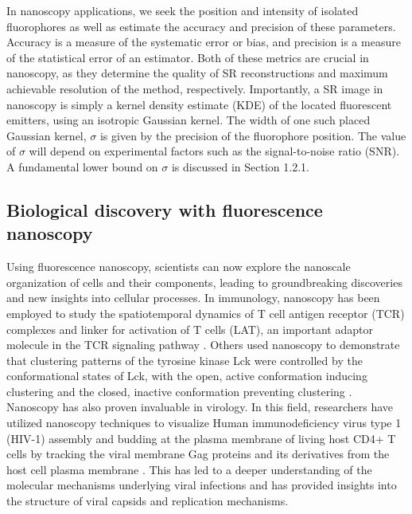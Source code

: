 In nanoscopy applications, we seek the position and intensity of isolated fluorophores as well as estimate the accuracy and precision of these parameters. Accuracy is a measure of the systematic error or bias, and precision is a measure of the statistical error of an estimator. Both of these metrics are crucial in nanoscopy, as they determine the quality of SR reconstructions and maximum achievable resolution of the method, respectively. Importantly, a SR image in nanoscopy is simply a kernel density estimate (KDE) of the located fluorescent emitters, using an isotropic Gaussian kernel. The width of one such placed Gaussian kernel, $\sigma$ is given by the precision of the fluorophore position. The value of $\sigma$ will depend on experimental factors such as the signal-to-noise ratio (SNR). A fundamental lower bound on $\sigma$ is discussed in Section 1.2.1.

\subsection{Biological discovery with fluorescence nanoscopy}

Using fluorescence nanoscopy, scientists can now explore the nanoscale organization of cells and their components, leading to groundbreaking discoveries and new insights into cellular processes. In immunology, nanoscopy has been employed to study the spatiotemporal dynamics of T cell antigen receptor (TCR) complexes and linker for activation of T cells (LAT), an important adaptor molecule in the TCR signaling pathway \parencite{Lillemeier2010}. Others used nanoscopy to demonstrate that clustering patterns of the tyrosine kinase Lck were controlled by the conformational states of Lck, with the open, active conformation inducing clustering and the closed, inactive conformation preventing clustering \parencite{Rossy2013}. Nanoscopy has also proven invaluable in virology. In this field, researchers have utilized nanoscopy techniques to visualize Human immunodeficiency virus type 1 (HIV-1) assembly and budding at the plasma membrane of living host CD4+ T cells by tracking the viral membrane Gag proteins and its derivatives from the host cell plasma membrane \parencite{Floderer2018}. This has led to a deeper understanding of the molecular mechanisms underlying viral infections and has provided insights into the structure of viral capsids and replication mechanisms.


